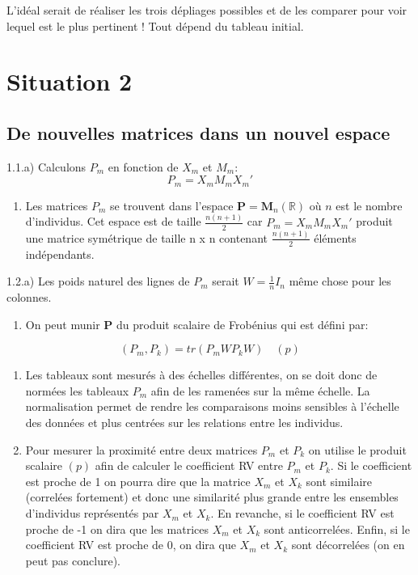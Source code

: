 \documentclass[
]{article}
\providecommand{\tightlist}{%
  \setlength{\itemsep}{0pt}\setlength{\parskip}{0pt}}
\begin{document}
L'idéal serait de réaliser les trois dépliages possibles et de les
comparer pour voir lequel est le plus pertinent ! Tout dépend du tableau
initial.

\hypertarget{situation-2}{%
\section{Situation 2}\label{situation-2}}

\hypertarget{de-nouvelles-matrices-dans-un-nouvel-espace}{%
\subsection{De nouvelles matrices dans un nouvel
espace}\label{de-nouvelles-matrices-dans-un-nouvel-espace}}

1.1.a) Calculons \(P_m\) en fonction de \(X_m\) et \(M_m\):
\[P_m = X_m M_m X_m'\]

\begin{enumerate}
\def\labelenumi{\alph{enumi})}
\setcounter{enumi}{1}
\tightlist
\item
  Les matrices \(P_m\) se trouvent dans l'espace
  \(\mathbf{P} = \mathbf{M}_n(\mathbb{R})\) où \(n\) est le nombre
  d'individus. Cet espace est de taille \(\frac{n(n+1)}{2}\) car
  \(P_m = X_m M_m X_m'\) produit une matrice symétrique de taille n x n
  contenant \(\frac{n(n+1)}{2}\) éléments indépendants.
\end{enumerate}

1.2.a) Les poids naturel des lignes de \(P_m\) serait
\(W = \frac{1}{n}I_n\) même chose pour les colonnes.

\begin{enumerate}
\def\labelenumi{\alph{enumi})}
\setcounter{enumi}{1}
\tightlist
\item
  On peut munir \(\mathbf{P}\) du produit scalaire de Frobénius qui est
  défini par:
\end{enumerate}

\[(P_m,P_k) = tr(P_m W P_k W) \quad (p)\]

\begin{enumerate}
\def\labelenumi{\alph{enumi})}
\setcounter{enumi}{2}
\item
  Les tableaux sont mesurés à des échelles différentes, on se doit donc
  de normées les tableaux \(P_m\) afin de les ramenées sur la même
  échelle. La normalisation permet de rendre les comparaisons moins
  sensibles à l'échelle des données et plus centrées sur les relations
  entre les individus.
\item
  Pour mesurer la proximité entre deux matrices \(P_m\) et \(P_k\) on
  utilise le produit scalaire \((p)\) afin de calculer le coefficient RV
  entre \(P_m\) et \(P_k\). Si le coefficient est proche de 1 on pourra
  dire que la matrice \(X_m\) et \(X_k\) sont similaire (correlées
  fortement) et donc une similarité plus grande entre les ensembles
  d'individus représentés par \(X_m\) et \(X_k\). En revanche, si le
  coefficient RV est proche de -1 on dira que les matrices \(X_m\) et
  \(X_k\) sont anticorrelées. Enfin, si le coefficient RV est proche de
  0, on dira que \(X_m\) et \(X_k\) sont décorrelées (on en peut pas
  conclure).
\end{enumerate}
\end{document}
